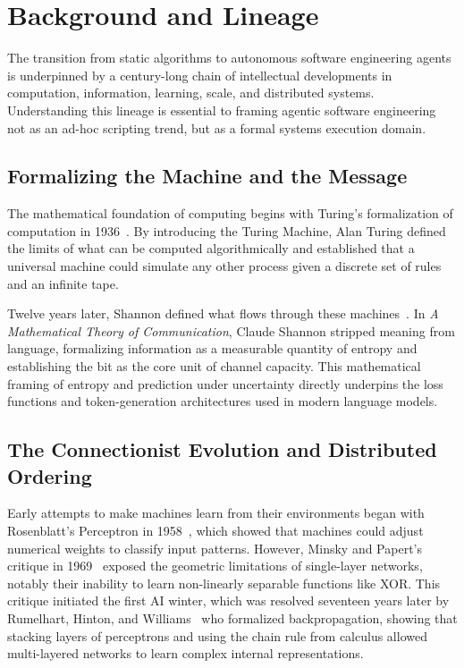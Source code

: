 \section{Background and Lineage}
\label{sec:background}

The transition from static algorithms to autonomous software engineering agents is underpinned by a century-long chain of intellectual developments in computation, information, learning, scale, and distributed systems. Understanding this lineage is essential to framing agentic software engineering not as an ad-hoc scripting trend, but as a formal systems execution domain.

\subsection{Formalizing the Machine and the Message}
The mathematical foundation of computing begins with Turing's formalization of computation in 1936~\cite{turing1936computable}. By introducing the Turing Machine, Alan Turing defined the limits of what can be computed algorithmically and established that a universal machine could simulate any other process given a discrete set of rules and an infinite tape. 

Twelve years later, Shannon defined what flows through these machines~\cite{shannon1948mathematical}. In \emph{A Mathematical Theory of Communication}, Claude Shannon stripped meaning from language, formalizing information as a measurable quantity of entropy and establishing the bit as the core unit of channel capacity. This mathematical framing of entropy and prediction under uncertainty directly underpins the loss functions and token-generation architectures used in modern language models.

\subsection{The Connectionist Evolution and Distributed Ordering}
Early attempts to make machines learn from their environments began with Rosenblatt's Perceptron in 1958~\cite{rosenblatt1958perceptron}, which showed that machines could adjust numerical weights to classify input patterns. However, Minsky and Papert's critique in 1969~\cite{minsky1969perceptrons} exposed the geometric limitations of single-layer networks, notably their inability to learn non-linearly separable functions like XOR. This critique initiated the first AI winter, which was resolved seventeen years later by Rumelhart, Hinton, and Williams~\cite{rumelhart1986learning} who formalized backpropagation, showing that stacking layers of perceptrons and using the chain rule from calculus allowed multi-layered networks to learn complex internal representations.

